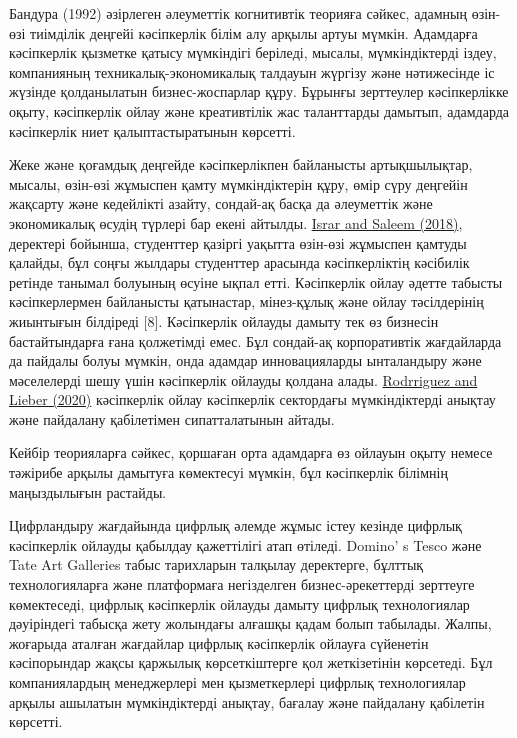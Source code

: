 \begin{multicols}{2}
Бандура (1992) әзірлеген әлеуметтік когнитивтік теорияға сәйкес, адамның
өзін-өзі тиімділік деңгейі кәсіпкерлік білім алу арқылы артуы мүмкін.
Адамдарға кәсіпкерлік қызметке қатысу мүмкіндігі беріледі, мысалы,
мүмкіндіктерді іздеу, компанияның техникалық-экономикалық талдауын
жүргізу және нәтижесінде іс жүзінде қолданылатын бизнес-жоспарлар құру.
Бұрынғы зерттеулер кәсіпкерлікке оқыту, кәсіпкерлік ойлау және
креативтілік жас таланттарды дамытып, адамдарда кәсіпкерлік ниет
қалыптастыратынын көрсетті.

Жеке және қоғамдық деңгейде кәсіпкерлікпен байланысты артықшылықтар,
мысалы, өзін-өзі жұмыспен қамту мүмкіндіктерін құру, өмір сүру деңгейін
жақсарту және кедейлікті азайту, сондай-ақ басқа да әлеуметтік және
экономикалық өсудің түрлері бар екені айтылды.
\href{https://www.frontiersin.org/articles/10.3389/fpsyg.2023.1240910/full\#ref31}{Israr
and Saleem (2018)}, деректері бойынша, студенттер қазіргі уақытта
өзін-өзі жұмыспен қамтуды қалайды, бұл соңғы жылдары студенттер арасында
кәсіпкерліктің кәсібилік ретінде танымал болуының өсуіне ықпал етті.
Кәсіпкерлік ойлау әдетте табысты кәсіпкерлермен байланысты қатынастар,
мінез-құлық және ойлау тәсілдерінің жиынтығын білдіреді {[}8{]}.
Кәсіпкерлік ойлауды дамыту тек өз бизнесін бастайтындарға ғана
қолжетімді емес. Бұл сондай-ақ корпоративтік жағдайларда да пайдалы
болуы мүмкін, онда адамдар инновацияларды ынталандыру және мәселелерді
шешу үшін кәсіпкерлік ойлауды қолдана алады.
\href{https://www.frontiersin.org/articles/10.3389/fpsyg.2023.1240910/full\#ref51}{Rodrriguez
and Lieber (2020)} кәсіпкерлік ойлау кәсіпкерлік сектордағы
мүмкіндіктерді анықтау және пайдалану қабілетімен сипатталатынын айтады.

Кейбір теорияларға сәйкес, қоршаған орта адамдарға өз ойлауын оқыту
немесе тәжірибе арқылы дамытуға көмектесуі мүмкін, бұл кәсіпкерлік
білімнің маңыздылығын растайды.

Цифрландыру жағдайында цифрлық әлемде жұмыс істеу кезінде цифрлық
кәсіпкерлік ойлауды қабылдау қажеттілігі атап өтіледі.
Domino' s Tesco және Tate Art Galleries табыс тарихларын
талқылау деректерге, бұлттық технологияларға және платформаға
негізделген бизнес-әрекеттерді зерттеуге көмектеседі, цифрлық
кәсіпкерлік ойлауды дамыту цифрлық технологиялар дәуіріндегі табысқа
жету жолындағы алғашқы қадам болып табылады. Жалпы, жоғарыда аталған
жағдайлар цифрлық кәсіпкерлік ойлауға сүйенетін кәсіпорындар жақсы
қаржылық көрсеткіштерге қол жеткізетінін көрсетеді. Бұл компаниялардың
менеджерлері мен қызметкерлері цифрлық технологиялар арқылы ашылатын
мүмкіндіктерді анықтау, бағалау және пайдалану қабілетін көрсетті.


\end{multicols}
